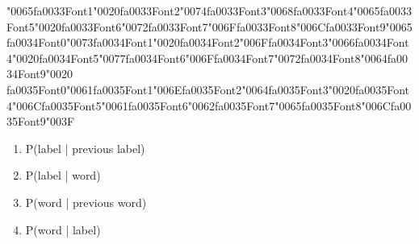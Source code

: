 \documentclass[12pt]{article}
\begin{document}
\begin{enumerate}[label=Q\arabic*.]
{\char"0065}{\csname fa0033Font1\endcsname\char"0020}{\csname fa0033Font2\endcsname\char"0074}{\csname fa0033Font3\endcsname\char"0068}{\csname fa0033Font4\endcsname\char"0065}{\csname fa0033Font5\endcsname\char"0020}{\csname fa0033Font6\endcsname\char"0072}{\csname fa0033Font7\endcsname\char"006F}{\csname fa0033Font8\endcsname\char"006C}{\csname fa0033Font9\endcsname\char"0065} {\csname fa0034Font0\endcsname\char"0073}{\csname fa0034Font1\endcsname\char"0020}{\csname fa0034Font2\endcsname\char"006F}{\csname fa0034Font3\endcsname\char"0066}{\csname fa0034Font4\endcsname\char"0020}{\csname fa0034Font5\endcsname\char"0077}{\csname fa0034Font6\endcsname\char"006F}{\csname fa0034Font7\endcsname\char"0072}{\csname fa0034Font8\endcsname\char"0064}{\csname fa0034Font9\endcsname\char"0020} {\csname fa0035Font0\endcsname\char"0061}{\csname fa0035Font1\endcsname\char"006E}{\csname fa0035Font2\endcsname\char"0064}{\csname fa0035Font3\endcsname\char"0020}{\csname fa0035Font4\endcsname\char"006C}{\csname fa0035Font5\endcsname\char"0061}{\csname fa0035Font6\endcsname\char"0062}{\csname fa0035Font7\endcsname\char"0065}{\csname fa0035Font8\endcsname\char"006C}{\csname fa0035Font9\endcsname\char"003F}
\begin{enumerate}[label=(\Alph*)]
    \item P(label | previous label)
    \item P(label | word)
    \item P(word | previous word)
    \item P(word | label)
\end{enumerate}

\end{enumerate}
\end{document}

